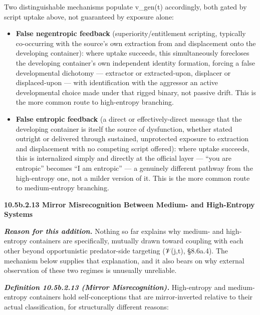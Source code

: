 \documentclass[
]{article}
\begin{document}
Two distinguishable mechanisms populate v\_gen(t) accordingly, both
gated by script uptake above, not guaranteed by exposure alone:

\begin{itemize}
\item
  \textbf{False negentropic feedback} (superiority/entitlement
  scripting, typically co-occurring with the source's own extraction
  from and displacement onto the developing container): where uptake
  succeeds, this simultaneously forecloses the developing container's
  own independent identity formation, forcing a false developmental
  dichotomy --- extractor or extracted-upon, displacer or displaced-upon
  --- with identification with the aggressor an active developmental
  choice made under that rigged binary, not passive drift. This is the
  more common route to high-entropy branching.
\item
  \textbf{False entropic feedback} (a direct or effectively-direct
  message that the developing container is itself the source of
  dysfunction, whether stated outright or delivered through sustained,
  unprotected exposure to extraction and displacement with no competing
  script offered): where uptake succeeds, this is internalized simply
  and directly at the official layer --- ``you are entropic'' becomes
  ``I am entropic'' --- a genuinely different pathway from the
  high-entropy one, not a milder version of it. This is the more common
  route to medium-entropy branching.
\end{itemize}

\textbf{10.5b.2.13 Mirror Misrecognition Between Medium- and
High-Entropy Systems}

\emph{\textbf{Reason for this addition.}} Nothing so far explains why
medium- and high-entropy containers are specifically, mutually drawn
toward coupling with each other beyond opportunistic predator-side
targeting (𝒱(j,t), §8.6a.4). The mechanism below supplies that
explanation, and it also bears on why external observation of these two
regimes is unusually unreliable.

\emph{\textbf{Definition 10.5b.2.13 (Mirror Misrecognition).}}
High-entropy and medium-entropy containers hold self-conceptions that
are mirror-inverted relative to their actual classification, for
structurally different reasons:
\end{document}
